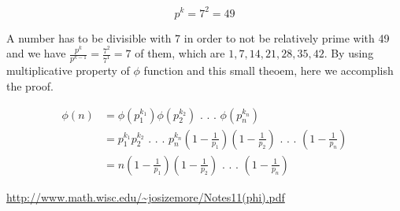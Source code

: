 \documentclass[11pt]{article}
\begin{document}
\begin{equation}
p^{k} = 7^2 = 49 
\end{equation}

A number has to be divisible with 7 in order to not be relatively prime with 49 and we have $\frac{p^k}{p^{k-1}} = \frac{7^2}{7^1} = 7$ of them, which are $1, 7, 14, 21, 28, 35, 42$.
By using multiplicative property of $\phi$ function and this small theoem, here we accomplish the proof.

\begin{equation}
\begin{split}
\phi(n) &= \phi (p_1^{k_1}) \phi (p_2^{k_2}) \text{ . . . } \phi (p_n^{k_n}) \\
&= p_1^{k_1}p_2^{k_2} \text{ . . . } p_n^{k_n} (1 - \frac{1}{p_1}) (1 - \frac{1}{p_2}) \text{ . . . } (1 - \frac{1}{p_n}) \\
&= n(1 - \frac{1}{p_1})(1 - \frac{1}{p_2}) \text{ . . . }(1 - \frac{1}{p_n}) 
\end{split}
\end{equation}

\begin{thebibliography}{99}

\url{http://www.math.wisc.edu/~josizemore/Notes11(phi).pdf}

\end{thebibliography}
\end{document}
